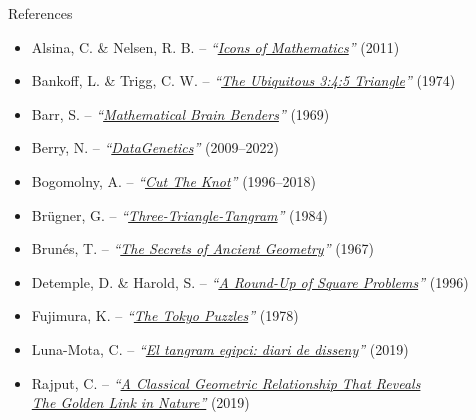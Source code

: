 \documentclass[14pt]{beamer}
\begin{document}

    \begin{frame}[t]{References}
        \begin{center}
            \bigskip
            {\footnotesize
            \begin{itemize}
            
                \item Alsina, C. \& Nelsen, R. B. -- \emph{``\href{https://books.google.es/books?id=4DavMl7-aFgC}{Icons of Mathematics}''} (2011)
                \item Bankoff, L. \& Trigg, C. W. -- \emph{``\href{https://doi.org/10.2307/2688869}{The Ubiquitous 3:4:5 Triangle}''} (1974)
                \item Barr, S. -- \emph{``\href{https://books.google.es/books?id=qTLbB08-kX0C}{Mathematical Brain Benders}''} (1969)
                \item Berry, N. -- \emph{``\href{https://datagenetics.com/blog.html}{DataGenetics}''} (2009--2022)
                \item Bogomolny, A. -- \emph{``\href{https://www.cut-the-knot.org/}{Cut The Knot}''} (1996--2018)
                \item Brügner, G. -- \emph{``\href{https://doi.org/10.1007/BF02136037}{Three-Triangle-Tangram}''} (1984)
                \item Brunés, T. -- \emph{``\href{https://books.google.es/books?id=L4pBPgAACAAJ}{The Secrets of Ancient Geometry}''} (1967)
                \item Detemple, D. \& Harold, S. -- \emph{``\href{https://doi.org/10.2307/2691390}{A Round-Up of Square Problems}''} (1996)
                \item Fujimura, K. -- \emph{``\href{https://books.google.es/books?id=Bo0pAQAAMAAJ}{The Tokyo Puzzles}''} (1978)
                \item Luna-Mota, C. -- \emph{``\href{https://publicacions.iec.cat/PopulaFitxa.do?idCatalogacio=33008}{El tangram egipci: diari de disseny}''}  (2019)
                \item Rajput, C. -- \emph{``\href{https://doi.org/10.24297/jam.v17i0.8498}{A Classical Geometric Relationship That Reveals}\\\qquad\qquad\qquad \href{https://doi.org/10.24297/jam.v17i0.8498}{The Golden Link in Nature''}} (2019)
            \end{itemize}}
            \bigskip\bigskip\bigskip\bigskip\bigskip
        \end{center}
    \end{frame}

\end{document}
